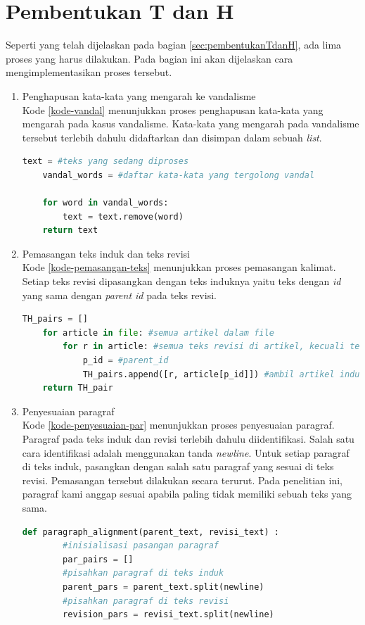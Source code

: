 \section{Pembentukan T dan H} 
Seperti yang telah dijelaskan pada bagian \ref{sec:pembentukanTdanH}, ada lima proses yang harus dilakukan. Pada bagian ini akan dijelaskan cara mengimplementasikan proses tersebut.
\begin{enumerate}
	\item Penghapusan kata-kata yang mengarah ke vandalisme\\
	Kode \ref{kode-vandal} menunjukkan proses penghapusan kata-kata yang mengarah pada kasus vandalisme. Kata-kata yang mengarah pada vandalisme tersebut terlebih dahulu didaftarkan dan disimpan dalam sebuah \textit{list}.
	\begin{lstlisting}[language=Python, caption={Penghapusan kata-kata yang mengarah ke vandalisme}, label={kode-vandal}]
	text = #teks yang sedang diproses
	vandal_words = #daftar kata-kata yang tergolong vandal
	
	for word in vandal_words: 
		text = text.remove(word)
	return text
	\end{lstlisting}	
	\item Pemasangan teks induk dan teks revisi\\
	Kode \ref{kode-pemasangan-teks} menunjukkan proses pemasangan kalimat. Setiap teks revisi dipasangkan dengan teks induknya yaitu teks dengan \textit{id} yang sama dengan \textit{parent id} pada teks revisi.
	\begin{lstlisting}[language=Python, caption={Pemasangan teks induk dan revisi}, label={kode-pemasangan-teks}]
	TH_pairs = []
	for article in file: #semua artikel dalam file
		for r in article: #semua teks revisi di artikel, kecuali teks pertama
			p_id = #parent_id
			TH_pairs.append([r, article[p_id]]) #ambil artikel induk
	return TH_pair
	\end{lstlisting}
	
	\item Penyesuaian paragraf\\
	Kode \ref{kode-penyesuaian-par} menunjukkan proses penyesuaian paragraf. Paragraf pada teks induk dan revisi terlebih dahulu diidentifikasi. Salah satu cara identifikasi adalah menggunakan tanda \textit{newline}. Untuk setiap paragraf di teks induk, pasangkan dengan salah satu paragraf yang sesuai di teks revisi. Pemasangan tersebut dilakukan secara terurut. Pada penelitian ini, paragraf kami anggap sesuai apabila paling tidak memiliki sebuah teks yang sama. 
	\begin{lstlisting}[language=Python, caption={Penyesuaian paragraf}, label={kode-penyesuaian-par}]
	def paragraph_alignment(parent_text, revisi_text) :	
		#inisialisasi pasangan paragraf
		par_pairs = []
		#pisahkan paragraf di teks induk
		parent_pars = parent_text.split(newline)
		#pisahkan paragraf di teks revisi
		revision_pars = revisi_text.split(newline)	
		

\end{lstlisting}
\end{enumerate}
